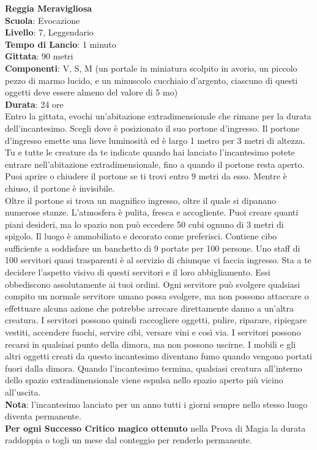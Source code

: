 \begin{multicols}{2}
\medskip\textbf{Reggia Meravigliosa}\\
\textbf{Scuola}: Evocazione\\
\textbf{Livello}: 7, Leggendario\\
\textbf{Tempo di Lancio}: 1 minuto\\
\textbf{Gittata}: 90 metri\\
\textbf{Componenti}: V, S, M (un portale in miniatura scolpito in avorio, un piccolo pezzo di marmo lucido, e un minuscolo cucchiaio d'argento, ciascuno di questi oggetti deve essere almeno del valore di 5 mo)\\
\textbf{Durata}: 24 ore\\
Entro la gittata, evochi un'abitazione extradimensionale che rimane per la durata dell'incantesimo. Scegli dove è posizionato il suo portone d'ingresso. Il portone d'ingresso emette una lieve luminosità ed è largo 1 metro per 3 metri di altezza. Tu e tutte le creature da te indicate quando hai lanciato l'incantesimo potete entrare nell'abitazione extradimensionale, fino a quando il portone resta aperto. Puoi aprire o chiudere il portone se ti trovi entro 9 metri da esso. Mentre è chiuso, il portone è invisibile.\\
Oltre il portone si trova un magnifico ingresso, oltre il quale si dipanano numerose stanze. L'atmosfera è pulita, fresca e accogliente. Puoi creare quanti piani desideri, ma lo spazio non può eccedere 50 cubi ognuno di 3 metri di spigolo. Il luogo è ammobiliato e decorato come preferisci. Contiene cibo sufficiente a soddisfare un banchetto di 9 portate per 100 persone. Uno staff di 100 servitori quasi trasparenti è al servizio di chiunque vi faccia ingresso. Sta a te decidere l'aspetto visivo di questi servitori e il loro abbigliamento. Essi obbediscono assolutamente ai tuoi ordini. Ogni servitore può svolgere qualsiasi compito un normale servitore umano possa svolgere, ma non possono attaccare o effettuare alcuna azione che potrebbe arrecare direttamente danno a un'altra creatura. I servitori possono quindi raccogliere oggetti, pulire, riparare, ripiegare vestiti, accendere fuochi, servire cibi, versare vini e così via. I servitori possono recarsi in qualsiasi punto della dimora, ma non possono uscirne. I mobili e gli altri oggetti creati da questo incantesimo diventano fumo quando vengono portati fuori dalla dimora. Quando l'incantesimo termina, qualsiasi creatura all'interno dello spazio extradimensionale viene espulsa nello spazio aperto più vicino all'uscita.\\
\textbf{Nota}: l'incantesimo lanciato per un anno tutti i giorni sempre nello stesso luogo diventa permanente.\\
\textbf{Per ogni Successo Critico magico ottenuto} nella Prova di Magia la durata raddoppia o togli un mese dal conteggio per renderlo permanente.


\end{multicols}
